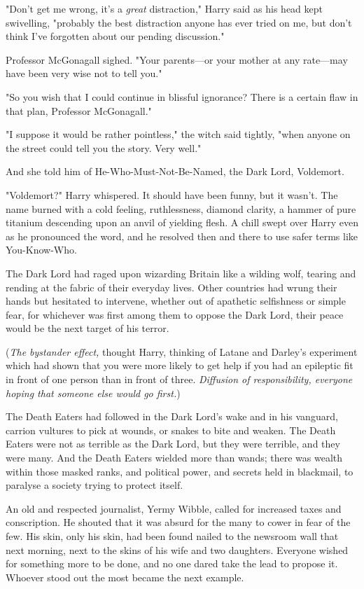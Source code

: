 "Don't get me wrong, it's a \emph{great} distraction," Harry said as his head
kept swivelling, "probably the best distraction anyone has ever tried on me,
but don't think I've forgotten about our pending discussion."

Professor McGonagall sighed. "Your parents---or your mother at any rate---may
have been very wise not to tell you."

"So you wish that I could continue in blissful ignorance? There is a certain
flaw in that plan, Professor McGonagall."

"I suppose it would be rather pointless," the witch said tightly, "when anyone
on the street could tell you the story. Very well."

And she told him of He-Who-Must-Not-Be-Named, the Dark Lord, Voldemort.

"Voldemort?" Harry whispered. It should have been funny, but it wasn't. The
name burned with a cold feeling, ruthlessness, diamond clarity, a hammer of
pure titanium descending upon an anvil of yielding flesh. A chill swept over
Harry even as he pronounced the word, and he resolved then and there to use
safer terms like You-Know-Who.

The Dark Lord had raged upon wizarding Britain like a wilding wolf, tearing and
rending at the fabric of their everyday lives. Other countries had wrung their
hands but hesitated to intervene, whether out of apathetic selfishness or
simple fear, for whichever was first among them to oppose the Dark Lord, their
peace would be the next target of his terror.

(\emph{The bystander effect,} thought Harry, thinking of Latane and Darley's
experiment which had shown that you were more likely to get help if you had an
epileptic fit in front of one person than in front of three. \emph{Diffusion of
responsibility, everyone hoping that someone else would go first.})

The Death Eaters had followed in the Dark Lord's wake and in his vanguard,
carrion vultures to pick at wounds, or snakes to bite and weaken. The Death
Eaters were not as terrible as the Dark Lord, but they were terrible, and they
were many. And the Death Eaters wielded more than wands; there was wealth
within those masked ranks, and political power, and secrets held in blackmail,
to paralyse a society trying to protect itself.

An old and respected journalist, Yermy Wibble, called for increased taxes and
conscription. He shouted that it was absurd for the many to cower in fear of
the few. His skin, only his skin, had been found nailed to the newsroom wall
that next morning, next to the skins of his wife and two daughters. Everyone
wished for something more to be done, and no one dared take the lead to propose
it. Whoever stood out the most became the next example.

